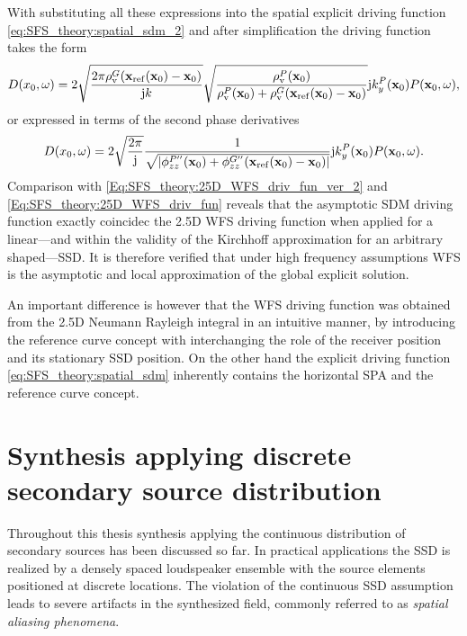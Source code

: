 With substituting all these expressions into the spatial explicit driving function \eqref{eq:SFS_theory:spatial_sdm_2} and after simplification the driving function takes the form
\begin{equation}
D(x_0,\omega) =
2\sqrt{\frac{2\pi  \rho_\mathrm{v}^G(\mathbf{x}_{\mathrm{ref}}(\mathbf{x}_0)-\mathbf{x}_0)}{\mathrm{j} k}} 
\sqrt{\frac{\rho_\mathrm{v}^P(\mathbf{x}_0) }{\rho_\mathrm{v}^P(\mathbf{x}_0) + \rho_\mathrm{v}^G(\mathbf{x}_{\mathrm{ref}}(\mathbf{x}_0)-\mathbf{x}_0)}}
\mathrm{j} k_y^{P}(\mathbf{x}_0)
P(\mathbf{x}_0,\omega),
\end{equation}
or expressed in terms of the second phase derivatives 
\begin{equation}
D(x_0,\omega) =
2\sqrt{\frac{2\pi }{\mathrm{j} }} 
\frac{ 1 }{\sqrt{|\phi^{P''}_{zz}(\mathbf{x}_0) + \phi^{G''}_{zz}(\mathbf{x}_{\mathrm{ref}}(\mathbf{x}_0)-\mathbf{x}_0)|}}
\mathrm{j} k_y^{P}(\mathbf{x}_0)
P(\mathbf{x}_0,\omega).
\end{equation}
Comparison with \eqref{Eq:SFS_theory:25D_WFS_driv_fun_ver_2} and \eqref{Eq:SFS_theory:25D_WFS_driv_fun} reveals that the asymptotic SDM driving function exactly coincidec the 2.5D WFS driving function when applied for a linear---and within the validity of the Kirchhoff approximation for an arbitrary shaped---SSD.
It is therefore verified that under high frequency assumptions WFS is the asymptotic and local approximation of the global explicit solution.

An important difference is however that the WFS driving function was obtained from the 2.5D Neumann Rayleigh integral in an intuitive manner, by introducing the reference curve concept with interchanging the role of the receiver position and its stationary SSD position. 
On the other hand the explicit driving function \eqref{eq:SFS_theory:spatial_sdm} inherently contains the horizontal SPA and the reference curve concept.

\section{Synthesis applying discrete secondary source distribution}
\label{Sec:Aliasing}

Throughout this thesis synthesis applying the continuous distribution of secondary sources has been discussed so far.
In practical applications the SSD is realized by a densely spaced loudspeaker ensemble with the source elements positioned at discrete locations.
The violation of the continuous SSD assumption leads to severe artifacts in the synthesized field, commonly referred to as \emph{spatial aliasing phenomena}.

